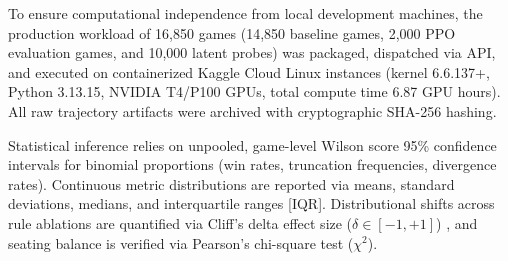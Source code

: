 \documentclass[journal]{IEEEtran}
\begin{document}
To ensure computational independence from local development machines, the production workload of 16,850 games (14,850 baseline games, 2,000 PPO evaluation games, and 10,000 latent probes) was packaged, dispatched via API, and executed on containerized Kaggle Cloud Linux instances (kernel 6.6.137+, Python 3.13.15, NVIDIA T4/P100 GPUs, total compute time 6.87 GPU hours). All raw trajectory artifacts were archived with cryptographic SHA-256 hashing.

Statistical inference relies on unpooled, game-level Wilson score 95\% confidence intervals \cite{wilson1927probable} for binomial proportions (win rates, truncation frequencies, divergence rates). Continuous metric distributions are reported via means, standard deviations, medians, and interquartile ranges [IQR]. Distributional shifts across rule ablations are quantified via Cliff's delta effect size ($\delta \in [-1, +1]$) \cite{cliff1993dominance}, and seating balance is verified via Pearson's chi-square test ($\chi^2$).

\begin{table}[t]
\centering
\caption{WHOT-NG-v1 Baseline Characterization (EXP-01, $N = 2{,}000$ Episodes)}
\label{tab:exp01_characterization}
\small
{}
\end{table}
\end{document}
